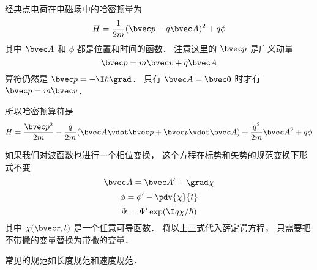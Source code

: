 

经典点电荷在电磁场中的哈密顿量为
\begin{equation}
H = \frac{1}{2m}(\bvec p - q\bvec A)^2 + q\phi
\end{equation}
其中 $\bvec A$ 和 $\phi$ 都是位置和时间的函数． 注意这里的 $\bvec p$ 是广义动量
\begin{equation}
\bvec p = m\bvec v + q\bvec A
\end{equation}
算符仍然是 ${\bvec p} = -\I\hbar\grad$． 只有 $\bvec A = \bvec 0$ 时才有 $\bvec p = m\bvec v$．

所以哈密顿算符是
\begin{equation}
H = \frac{\bvec p^2}{2m} - \frac{q}{2m}(\bvec A\vdot \bvec p + \bvec p \vdot \bvec A) + \frac{q^2}{2m} \bvec A^2 + q\phi
\end{equation}

如果我们对波函数也进行一个相位变换， 这个方程在标势和矢势的规范变换下形式不变
\begin{equation}
\bvec A = \bvec A' + \grad \chi
\end{equation}
\begin{equation}
\phi = \phi' - \pdv{\chi}{t}
\end{equation}
\begin{equation}
\Psi = \Psi' \exp(\I q\chi/\hbar)
\end{equation}
其中 $\chi(\bvec r, t)$ 是一个任意可导函数． 将以上三式代入薛定谔方程， 只需要把不带撇的变量替换为带撇的变量．

常见的规范如长度规范和速度规范．

